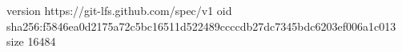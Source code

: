 version https://git-lfs.github.com/spec/v1
oid sha256:f5846ea0d2175a72c5bc16511d522489ccccdb27dc7345bdc6203ef006a1c013
size 16484
